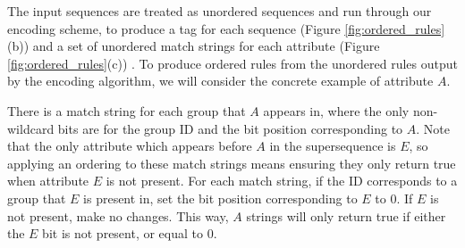 The input sequences are treated as unordered sequences and run through our encoding scheme, to produce a tag for each sequence (Figure \ref{fig:ordered_rules}(b)) and a set of unordered match strings for each attribute (Figure \ref{fig:ordered_rules}(c)) . 
To produce ordered rules from the unordered rules output by the encoding algorithm, we will consider the concrete example of attribute $A$. 

There is a match string for each group that $A$ appears in, where the only non-wildcard bits are for the group ID and the bit position corresponding to $A$. Note that the only attribute which appears before $A$ in the supersequence is $E$, so applying an ordering to these match strings means ensuring they only return true when attribute $E$ is not present. 
 For each match string, if the ID corresponds to a group that $E$ is present in, set the bit position corresponding to $E$ to 0. If $E$ is not present, make no changes. This way, $A$ strings will only return true if either the $E$ bit is not present, or equal to 0. 